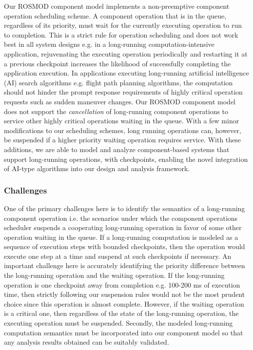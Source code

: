 Our ROSMOD component model implements a non-preemptive component operation scheduling scheme. A component operation that is in the queue, regardless of its priority, must wait for the currently executing operation to run to completion. This is a strict rule for operation scheduling and does not work best in all system designs e.g. in a long-running computation-intensive application, rejuvenating the executing operation periodically and restarting it at a previous checkpoint increases the likelihood of successfully completing the application execution. In applications executing long-running artificial intelligence (AI) search algorithms e.g. flight path planning algorithms, the computation should not hinder the prompt response requirements of highly critical operation requests such as sudden maneuver changes. Our ROSMOD component model does not support the \emph{cancellation} of long-running component operations to service other highly critical operations waiting in the queue. With a few minor modifications to our scheduling schemes, long running operations can, however, be suspended if a higher priority waiting operation requires service. With these additions, we are able to model and analyze component-based systems that support long-running operations, with checkpoints, enabling the novel integration of AI-type algorithms into our design and analysis framework. 

\subsubsection{Challenges}

One of the primary challenges here is to identify the semantics of a long-running component operation i.e. the scenarios under which the component operations scheduler suspends a cooperating long-running operation in favor of some other operation waiting in the queue. If a long-running computation is modeled as a sequence of execution steps with bounded checkpoints, then the operation would execute one step at a time and suspend at such checkpoints if necessary. An important challenge here is accurately identifying the priority difference between the long-running operation and the waiting operation. If the long-running operation is one checkpoint away from completion e.g. 100-200 ms of execution time, then strictly following our suspension rules would not be the most prudent choice since this operation is almost complete. However, if the waiting operation is a critical one, then regardless of the state of the long-running operation, the executing operation must be suspended. Secondly, the modeled long-running computation semantics must be incorporated into our component model so that any analysis results obtained can be suitably validated. 


